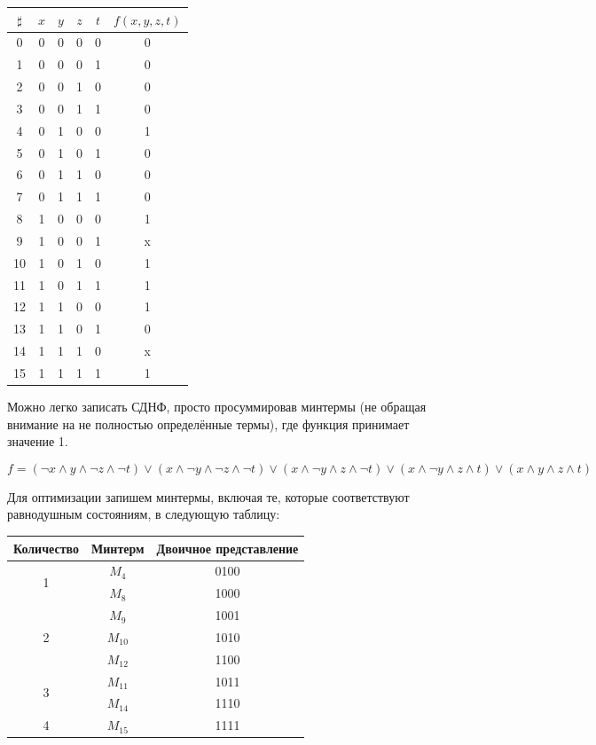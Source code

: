 \documentclass[12pt,letterpaper]{article}
\begin{document}
\begin{center}
\begin{tabular}{|c|c|c|c|c|c|}
  \hline
  \(\sharp\) & \(x\) & \(y\) & \(z\) & \(t\) & \(f(x, y, z, t)\) \\
  \hline
  0 & 0 & 0 & 0 & 0 & 0 \\
  \hline
  1 & 0 & 0 & 0 & 1 & 0 \\
  \hline
  2 & 0 & 0 & 1 & 0 & 0 \\
  \hline
  3 & 0 & 0 & 1 & 1 & 0 \\
  \hline
  4 & 0 & 1 & 0 & 0 & 1 \\
  \hline
  5 & 0 & 1 & 0 & 1 & 0 \\
  \hline
  6 & 0 & 1 & 1 & 0 & 0 \\
  \hline
  7 & 0 & 1 & 1 & 1 & 0 \\
  \hline
  8 & 1 & 0 & 0 & 0 & 1 \\
  \hline
  9 & 1 & 0 & 0 & 1 & x \\
  \hline
  10 & 1 & 0 & 1 & 0 & 1 \\
  \hline
  11 & 1 & 0 & 1 & 1 & 1 \\
  \hline
  12 & 1 & 1 & 0 & 0 & 1 \\
  \hline
  13 & 1 & 1 & 0 & 1 & 0 \\
  \hline
  14 & 1 & 1 & 1 & 0 & x \\
  \hline
  15 & 1 & 1 & 1 & 1 & 1 \\
  \hline
\end{tabular}
\end{center}

Можно легко записать СДНФ, просто просуммировав минтермы (не обращая внимание на не полностью определённые термы), где функция принимает значение 1.

\[f = (\neg x \wedge y \wedge \neg z \wedge \neg t) \vee (x \wedge \neg y \wedge \neg z \wedge \neg t) \vee (x \wedge \neg y \wedge z \wedge \neg t) \vee (x \wedge \neg y \wedge z \wedge t) \vee (x \wedge y \wedge z \wedge t)\]

Для оптимизации запишем минтермы, включая те, которые соответствуют равнодушным состояниям, в следующую таблицу:

\begin{center}
\begin{tabular}{|c|c|c|}
  \hline
  Количество & Минтерм & Двоичное представление \\
  \hline
  \multirow{2}{*}{1} & \(M_4\) & 0100 \\
  \cline{2-3} & \(M_8\) & 1000 \\
  \hline
  \multirow{3}{*}{2} & \(M_9\) & 1001 \\
  \cline{2-3} & \(M_{10}\) & 1010 \\
  \cline{2-3} & \(M_{12}\) & 1100 \\
  \hline
  \multirow{2}{*}{3} & \(M_{11}\) & 1011 \\
  \cline{2-3} & \(M_{14}\) & 1110 \\
  \hline
  4 & \(M_{15}\) & 1111 \\
  \hline
\end{tabular}
\end{center}
\end{document}
